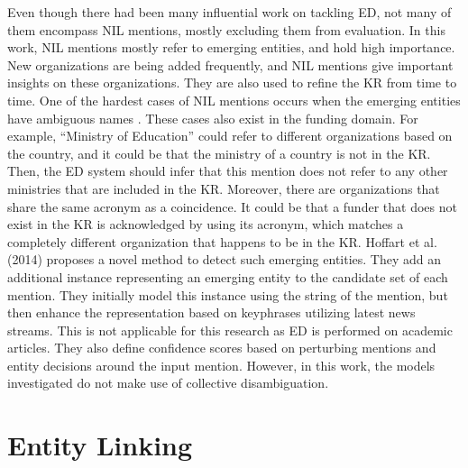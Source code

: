 \documentclass{report}
\theoremstyle{definition}
\theoremstyle{remark}
\begin{document}
Even though there had been many influential work on tackling ED, not many of them encompass NIL mentions, mostly excluding them from evaluation. In this work, NIL mentions mostly refer to emerging entities, and hold high importance. New organizations are being added frequently, and NIL mentions give important insights on these organizations. They are also used to refine the KR from time to time. One of the hardest cases of NIL mentions occurs when the emerging entities have ambiguous names \cite{NILMentions}. These cases also exist in the funding domain. For example, ``Ministry of Education'' could refer to different organizations based on the country, and it could be that the ministry of a country is not in the KR. Then, the ED system should infer that this mention does not refer to any other ministries that are included in the KR. Moreover, there are organizations that share the same acronym as a coincidence. It could be that a funder that does not exist in the KR is acknowledged by using its acronym, which matches a completely different organization that happens to be in the KR. Hoffart et al. (2014) \cite{NILMentions} proposes a novel method to detect such emerging entities. They add an additional instance representing an emerging entity to the candidate set of each mention. They initially model this instance using the string of the mention, but then enhance the representation based on keyphrases utilizing latest news streams. This is not applicable for this research as ED is performed on academic articles. They also define confidence scores based on perturbing mentions and entity decisions around the input mention. However, in this work, the models investigated do not make use of collective disambiguation.

\section{Entity Linking}
\label{sota3}
\end{document}
